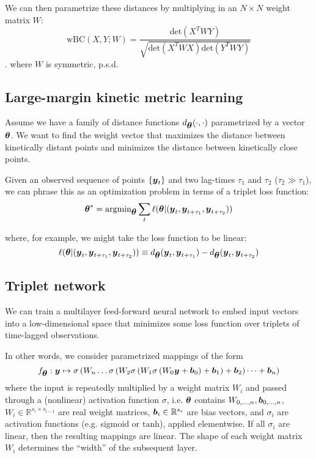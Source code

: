 \documentclass[aps,prl,preprint,nofootinbib,superscriptaddress,linenumbers]{revtex4-1}
\newcommand{\bfv}[1]{{\mbox{\boldmath{$#1$}}}}
\newcommand{\y}{\bfv{y}}
\newcommand{\params}{\bfv{\theta}}
\begin{document}
We can then parametrize these distances by multiplying in an $N\times N$ weight matrix $W$:
$$ \text{wBC}(X,Y; W) = \frac{\text{det}(X^T W Y)}{\sqrt{\text{det}(X^T W X) \text{det}(Y^T W Y)}} $$.
where $W$ is symmetric, p.s.d.

\subsection{Large-margin kinetic metric learning}
Assume we have a family of distance functions $d_\params(\cdot, \cdot)$ parametrized by a vector $\params$. We want to find the weight vector that maximizes the distance between kinetically distant points and minimizes the distance between kinetically close points.

Given an observed sequence of points $\{\y_t\}$ and two lag-times $\tau_1$ and $\tau_2$ ($\tau_2 \gg \tau_1$), we can phrase this as an optimization problem in terms of a triplet loss function:
$$\params^* = \text{argmin}_\params \sum_{t} \ell(\params | (\y_t,\y_{t+\tau_1},\y_{t+\tau_2}))$$

where, for example, we might take the loss function to be linear: $$ \ell(\params | (\y_t,\y_{t+\tau_1},\y_{t+\tau_2})) \equiv d_\params(\y_t,\y_{t+\tau_1})-d_\params(\y_t,\y_{t+\tau_2}) $$

\subsection{Triplet network}
We can train a multilayer feed-forward neural network to embed input vectors into a low-dimensional space that minimizes some loss function over triplets of time-lagged observations.

In other words, we consider parametrized mappings of the form
$$f_\params
:\y\mapsto
\sigma \left( W_n \dots \sigma \left( W_2 \sigma \left( W_1 \sigma \left( W_0 \y  + \bfv{b}_0 \right)  + \bfv{b}_1 \right)  + \bfv{b}_2 \right) \dots + \bfv{b}_n \right)$$
where the input is repeatedly multiplied by a weight matrix $W_i$ and passed through a (nonlinear) activation function $\sigma$, i.e. $\params$ contains ${W_{0, \dots, n},\bfv{b}_{0,\dots, n}}$, $W_i \in \mathbb{R}^{s_{i}\times s_{i-1}}$ are real weight matrices, $\bfv{b}_i \in \mathbb{R}^{s_i}$ are bias vectors, and $\sigma_i$ are activation functions (e.g. sigmoid or $\text{tanh}$), applied elementwise. If all $\sigma_i$ are linear, then the resulting mappings are linear. The shape of each weight matrix $W_i$ determines the ``width'' of the subsequent layer.
\end{document}
